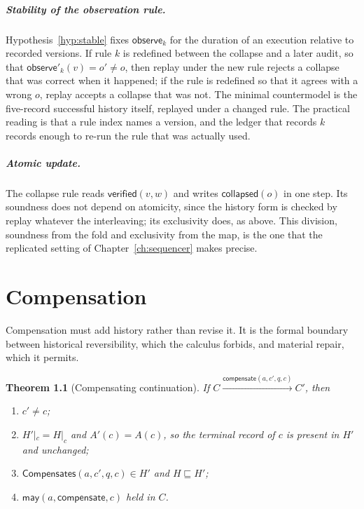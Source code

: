 \documentclass[11pt,openany]{book}
\newtheorem{theorem}{Theorem}[chapter]
\theoremstyle{remark}
\newcommand{\Compensates}{\mathsf{Compensates}}
\begin{document}
\paragraph{Stability of the observation rule.} Hypothesis~\ref{hyp:stable}
fixes $\mathsf{observe}_k$ for the duration of an execution relative to
recorded versions. If rule $k$ is redefined between the collapse and a
later audit, so that $\mathsf{observe}'_k(v)=o'\ne o$, then replay under
the new rule rejects a collapse that was correct when it happened; if the
rule is redefined so that it agrees with a wrong $o$, replay accepts a
collapse that was not. The minimal countermodel is the five-record
successful history itself, replayed under a changed rule. The practical
reading is that a rule index names a version, and the ledger that records
$k$ records enough to re-run the rule that was actually used.

\paragraph{Atomic update.} The collapse rule reads $\mathsf{verified}(v,w)$
and writes $\mathsf{collapsed}(o)$ in one step. Its soundness does not
depend on atomicity, since the history form is checked by replay whatever
the interleaving; its exclusivity does, as above. This division, soundness
from the fold and exclusivity from the map, is the one that the replicated
setting of Chapter~\ref{ch:sequencer} makes precise.

\chapter{Compensation}
\label{ch:compensation}

Compensation must add history rather than revise it. It is the formal
boundary between historical reversibility, which the calculus forbids, and
material repair, which it permits.

\begin{theorem}[Compensating continuation]\label{thm:compensation}
If $C\xrightarrow{\mathsf{compensate}(a,c',q,c)}C'$, then
\begin{enumerate}[label=(\roman*)]
\item $c'\neq c$;
\item $H'|_c=H|_c$ and $A'(c)=A(c)$, so the terminal record of $c$ is
present in $H'$ and unchanged;
\item $\Compensates(a,c',q,c)\in H'$ and $H\sqsubseteq H'$;
\item $\mathsf{may}(a,\mathsf{compensate},c)$ held in $C$.
\end{enumerate}
\end{theorem}
\end{document}

